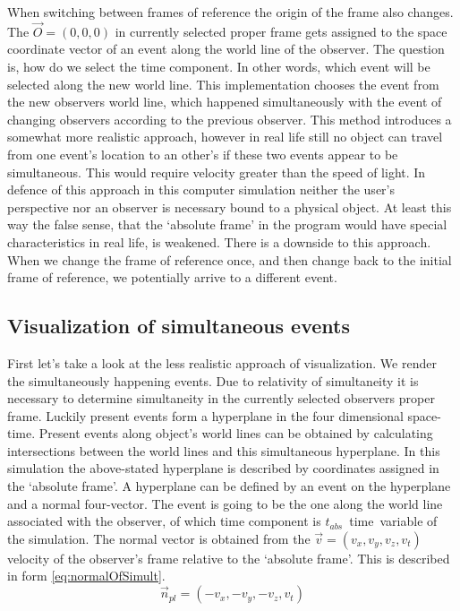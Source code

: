\documentclass{egpubl}
\begin{document}
When switching between frames of reference the origin of the frame also changes. The $\vec{O} =(0,0,0)$ in currently selected proper frame gets assigned to the space coordinate vector of an event along the world line of the observer. The question is, how do we select the time component. In other words, which event will be selected along the new world line. This implementation chooses the event from the new observers world line, which happened simultaneously with the event of changing observers according to the previous observer. This method introduces a somewhat more realistic approach, however in real life still no object can travel from one event's location to an other's if these two events appear to be simultaneous. This would require velocity greater than the speed of light. In defence of this approach in this computer simulation neither the user's perspective nor an observer is necessary bound to a physical object. At least this way the false sense, that the `absolute frame' in the program would have special characteristics in real life, is weakened. There is a downside to this approach. When we change the frame of reference once, and then change back to the initial frame of reference, we potentially arrive to a different event.

\subsection{Visualization of simultaneous events}
\label{visOfSimEvents}
First let's take a look at the less realistic approach of visualization.  We render the simultaneously happening events. Due to relativity of simultaneity it is necessary to determine simultaneity in the currently selected observers proper frame. Luckily present events form a hyperplane in the four dimensional space-time. Present events along object's world lines can be obtained by calculating intersections between the world lines and this simultaneous hyperplane. In this simulation the above-stated hyperplane is described by coordinates assigned in the `absolute frame'. A hyperplane can be defined by an event on the hyperplane and a normal four-vector. The event is going to be the one along the world line associated with the observer, of which time component is $t_{abs}$~time~variable of the simulation. The normal vector is obtained from the $\vec{v}=(v_x, v_y, v_z, v_t)$ velocity of the observer's frame relative to the `absolute frame'. This is described in form \ref{eq:normalOfSimult}.
\begin{equation}
\vec{n}_{pl} = (-v_x, -v_y, -v_z, v_t)
\label{eq:normalOfSimult}
\end{equation}
\end{document}
